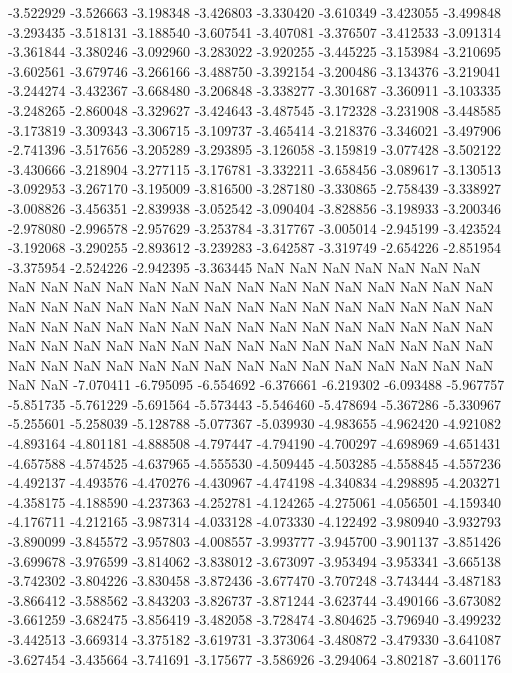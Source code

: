 -3.522929
-3.526663
-3.198348
-3.426803
-3.330420
-3.610349
-3.423055
-3.499848
-3.293435
-3.518131
-3.188540
-3.607541
-3.407081
-3.376507
-3.412533
-3.091314
-3.361844
-3.380246
-3.092960
-3.283022
-3.920255
-3.445225
-3.153984
-3.210695
-3.602561
-3.679746
-3.266166
-3.488750
-3.392154
-3.200486
-3.134376
-3.219041
-3.244274
-3.432367
-3.668480
-3.206848
-3.338277
-3.301687
-3.360911
-3.103335
-3.248265
-2.860048
-3.329627
-3.424643
-3.487545
-3.172328
-3.231908
-3.448585
-3.173819
-3.309343
-3.306715
-3.109737
-3.465414
-3.218376
-3.346021
-3.497906
-2.741396
-3.517656
-3.205289
-3.293895
-3.126058
-3.159819
-3.077428
-3.502122
-3.430666
-3.218904
-3.277115
-3.176781
-3.332211
-3.658456
-3.089617
-3.130513
-3.092953
-3.267170
-3.195009
-3.816500
-3.287180
-3.330865
-2.758439
-3.338927
-3.008826
-3.456351
-2.839938
-3.052542
-3.090404
-3.828856
-3.198933
-3.200346
-2.978080
-2.996578
-2.957629
-3.253784
-3.317767
-3.005014
-2.945199
-3.423524
-3.192068
-3.290255
-2.893612
-3.239283
-3.642587
-3.319749
-2.654226
-2.851954
-3.375954
-2.524226
-2.942395
-3.363445
NaN
NaN
NaN
NaN
NaN
NaN
NaN
NaN
NaN
NaN
NaN
NaN
NaN
NaN
NaN
NaN
NaN
NaN
NaN
NaN
NaN
NaN
NaN
NaN
NaN
NaN
NaN
NaN
NaN
NaN
NaN
NaN
NaN
NaN
NaN
NaN
NaN
NaN
NaN
NaN
NaN
NaN
NaN
NaN
NaN
NaN
NaN
NaN
NaN
NaN
NaN
NaN
NaN
NaN
NaN
NaN
NaN
NaN
NaN
NaN
NaN
NaN
NaN
NaN
NaN
NaN
NaN
NaN
NaN
NaN
NaN
NaN
NaN
NaN
NaN
NaN
NaN
NaN
NaN
NaN
NaN
NaN
NaN
NaN
-7.070411
-6.795095
-6.554692
-6.376661
-6.219302
-6.093488
-5.967757
-5.851735
-5.761229
-5.691564
-5.573443
-5.546460
-5.478694
-5.367286
-5.330967
-5.255601
-5.258039
-5.128788
-5.077367
-5.039930
-4.983655
-4.962420
-4.921082
-4.893164
-4.801181
-4.888508
-4.797447
-4.794190
-4.700297
-4.698969
-4.651431
-4.657588
-4.574525
-4.637965
-4.555530
-4.509445
-4.503285
-4.558845
-4.557236
-4.492137
-4.493576
-4.470276
-4.430967
-4.474198
-4.340834
-4.298895
-4.203271
-4.358175
-4.188590
-4.237363
-4.252781
-4.124265
-4.275061
-4.056501
-4.159340
-4.176711
-4.212165
-3.987314
-4.033128
-4.073330
-4.122492
-3.980940
-3.932793
-3.890099
-3.845572
-3.957803
-4.008557
-3.993777
-3.945700
-3.901137
-3.851426
-3.699678
-3.976599
-3.814062
-3.838012
-3.673097
-3.953494
-3.953341
-3.665138
-3.742302
-3.804226
-3.830458
-3.872436
-3.677470
-3.707248
-3.743444
-3.487183
-3.866412
-3.588562
-3.843203
-3.826737
-3.871244
-3.623744
-3.490166
-3.673082
-3.661259
-3.682475
-3.856419
-3.482058
-3.728474
-3.804625
-3.796940
-3.499232
-3.442513
-3.669314
-3.375182
-3.619731
-3.373064
-3.480872
-3.479330
-3.641087
-3.627454
-3.435664
-3.741691
-3.175677
-3.586926
-3.294064
-3.802187
-3.601176

